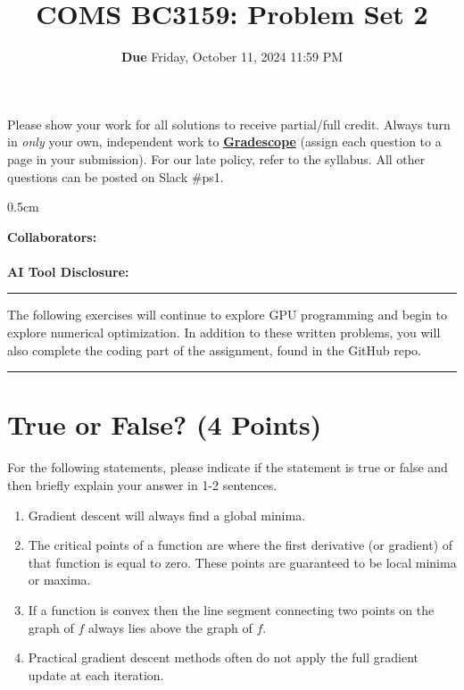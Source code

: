 \documentclass[]{article}
\title{\textbf{COMS BC3159:} Problem Set 2}
\author{\textbf{Due} Friday, October 11, 2024 11:59 PM\\
}
\date{}
\DeclareRobustCommand{\colorbox}[3][gray!10]{
  \begin{tcolorbox}[left=8pt, arc=0pt, outer arc=0pt, colframe=#1, colback=#1, coltext=black] #2 \end{tcolorbox}
}
\begin{document}
\maketitle

\colorbox {
Please show your work for all solutions to receive partial/full credit.  Always turn in \textit{only} your own, independent work to \href{https://www.gradescope.com/courses/820552}{\textbf{Gradescope}} (assign each question to a page in your submission).  For our late policy, refer to the syllabus.  All other questions can be posted on Slack \#ps1.
}

\vspace{0.5cm}

\textbf{Collaborators:}
\\ \\
\textbf{AI Tool Disclosure:}

\vspace{0.5cm}
\hrule
\vspace{0.5cm}
The following exercises will continue to explore GPU programming and begin to explore numerical optimization. In addition to these written problems, you will also complete the coding part of the assignment, found in the GitHub repo. 
\vspace{0.5cm}
\hrule

\section{True or False? (4 Points)}
For the following statements, please indicate if the statement is true or false and then briefly explain your answer in 1-2 sentences.
\begin{tcolorbox}[left=14pt, arc=0pt, outer arc=0pt, colframe=blue!5, colback=blue!5]
\begin{enumerate}[label=(\alph*)]
    \item Gradient descent will always find a global minima.
    \item The critical points of a function are where the first derivative (or gradient) of that function is equal to zero. These points are guaranteed to be local minima or maxima.
    \item If a function is convex then the line segment connecting two points on the graph of $f$ always lies above the graph of $f$.
    \item Practical gradient descent methods often do not apply the full gradient update at each iteration.
\end{enumerate}
\end{tcolorbox}
\end{document}
